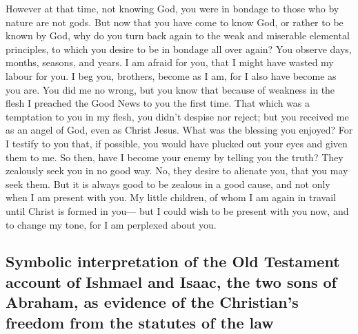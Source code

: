  However at that time, not knowing God, you were in
bondage to those who by nature are not gods.  But now that
you have come to know God, or rather to be known by God, why do you turn
back again to the weak and miserable elemental principles, to which you
desire to be in bondage all over again?  You observe
days, months, seasons, and years.  I am afraid for you,
that I might have wasted my labour for you.  I beg you,
brothers, become as I am, for I also have become as you are. You did me
no wrong,  but you know that because of weakness in the
flesh I preached the Good News to you the first time. 
That which was a temptation to you in my flesh, you didn't despise nor
reject; but you received me as an angel of God, even as Christ Jesus.
 What was the blessing you enjoyed? For I testify to you
that, if possible, you would have plucked out your eyes and given them
to me.  So then, have I become your enemy by telling you
the truth?  They zealously seek you in no good way. No,
they desire to alienate you, that you may seek them.  But
it is always good to be zealous in a good cause, and not only when I am
present with you.  My little children, of whom I am again
in travail until Christ is formed in you---  but I could
wish to be present with you now, and to change my tone, for I am
perplexed about you.

\hypertarget{symbolic-interpretation-of-the-old-testament-account-of-ishmael-and-isaac-the-two-sons-of-abraham-as-evidence-of-the-christians-freedom-from-the-statutes-of-the-law}{%
\subsection{Symbolic interpretation of the Old Testament account of
Ishmael and Isaac, the two sons of Abraham, as evidence of the
Christian's freedom from the statutes of the
law}\label{symbolic-interpretation-of-the-old-testament-account-of-ishmael-and-isaac-the-two-sons-of-abraham-as-evidence-of-the-christians-freedom-from-the-statutes-of-the-law}}


